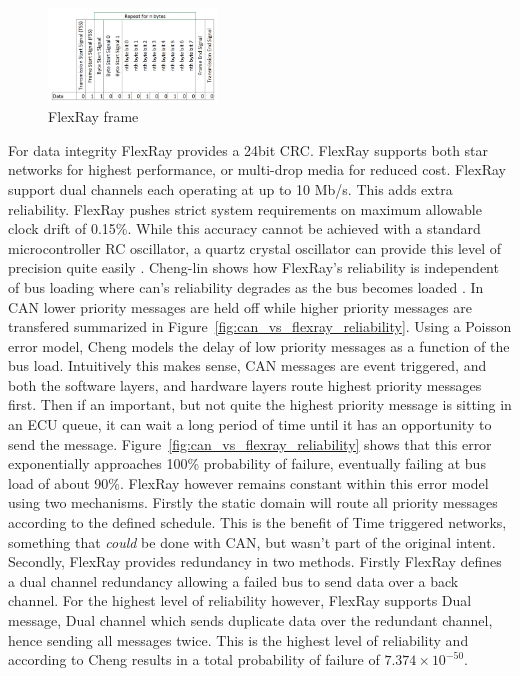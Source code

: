 \documentclass[conference,12pt]{IEEEtran}
\begin{document}
\begin{figure}
  \centering
  \includegraphics[width=0.4\textwidth]{Flexray.PNG}
  \caption{FlexRay frame}
  \label{fig:flexray_frame}
\end{figure}

For data integrity FlexRay provides a 24bit CRC. FlexRay supports both star
networks for highest performance,  or multi-drop media for reduced cost. FlexRay
support dual channels each operating at up to 10 Mb/s. This adds extra
reliability. FlexRay pushes strict system requirements on maximum allowable clock
drift of 0.15\%. While this accuracy cannot be achieved with a standard
microcontroller RC oscillator, a quartz crystal oscillator can provide this
level of precision quite easily \autocite{_crystal_2014}. Cheng-lin shows how
FlexRay's reliability is independent of bus loading where can's reliability
degrades as the bus becomes loaded \autocite{cheng-lin_real-time_2010}.  In CAN
lower priority messages are held off while higher priority messages are
transfered summarized in Figure~\ref{fig:can_vs_flexray_reliability}. Using
a Poisson error model, Cheng models the delay of low priority messages as
a function of the bus load. Intuitively this makes sense, CAN messages are event
triggered, and both the software layers, and hardware layers route highest
priority messages first. Then if an important, but not quite the highest
priority
message is sitting in an ECU queue, it can wait a long period of time until it
has an opportunity to send the message.
Figure~\ref{fig:can_vs_flexray_reliability} shows that this error
exponentially approaches 100\% probability of failure, eventually failing at
bus load of about 90\%. FlexRay however remains constant within this error
model using two mechanisms. Firstly the static domain will route all priority messages according
to the defined schedule. This is the benefit of Time triggered networks,
something that \emph{could} be done with CAN, but wasn't part of the original
intent. Secondly, FlexRay provides redundancy in two methods. Firstly FlexRay
defines a dual channel redundancy allowing a failed bus to send data over a back
channel. For the highest level of reliability however, FlexRay supports Dual
message, Dual channel which sends duplicate data over the redundant channel,
hence sending all messages twice.  This is the highest level of reliability and
according to Cheng results in a total probability of failure of $7.374 \times
10^{-50}$.
\end{document}

